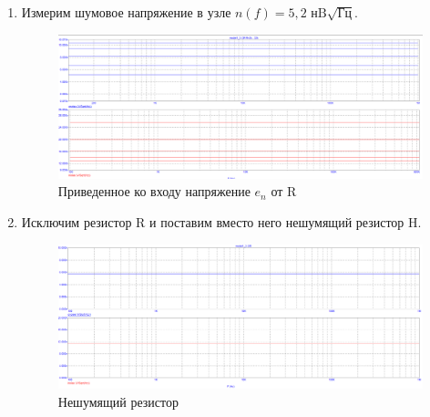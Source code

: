 \documentclass[a4paper, 12pt]{article}%
\begin{document}
\begin{enumerate}

\item

Измерим шумовое напряжение в узле $n(f) = 5,2 \text{ нB}\sqrt{\text{Гц}}$. 


\begin{figure}[h!]
    \centering
    \includegraphics[scale=0.3]{images/mod1_3_1.png}
    \caption{Приведенное ко входу напряжение $e_n$ от R}
    \label{fig:1_3_1}
\end{figure}



\item 

Исключим резистор R и поставим вместо него нешумящий резистор H. 

\begin{figure}[h!]
    \centering
    \includegraphics[scale=0.3]{images/mod1_3_2.png}
    \caption{Нешумящий резистор}
\end{figure}

\end{enumerate}
\end{document}
